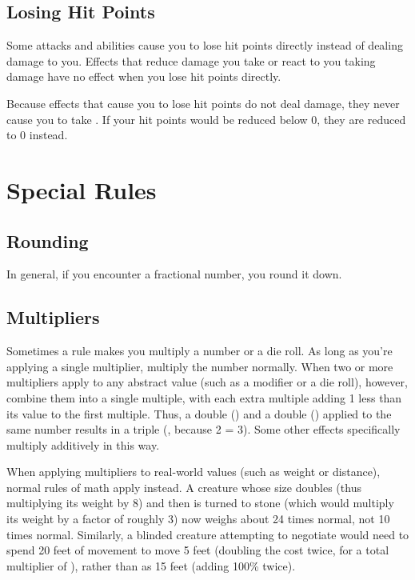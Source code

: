     \subsection{Losing Hit Points}\label{Losing Hit Points}
        Some attacks and abilities cause you to lose hit points directly instead of dealing damage to you.
        Effects that reduce damage you take or react to you taking damage have no effect when you lose hit points directly.

        Because effects that cause you to lose hit points do not deal damage, they never cause you to take .
        If your hit points would be reduced below 0, they are reduced to 0 instead.

\section{Special Rules}

    \subsection{Rounding}
        In general, if you encounter a fractional number, you round it down.

    \subsection{Multipliers}
        Sometimes a rule makes you multiply a number or a die roll.
        As long as you're applying a single multiplier, multiply the number normally.
        When two or more multipliers apply to any abstract value (such as a modifier or a die roll), however, combine them into a single multiple, with each extra multiple adding 1 less than its value to the first multiple.
        Thus, a double () and a double () applied to the same number results in a triple (, because 2  = 3).
        Some other effects specifically multiply additively in this way.

        When applying multipliers to real-world values (such as weight or distance), normal rules of math apply instead.
        A creature whose size doubles (thus multiplying its weight by 8) and then is turned to stone (which would multiply its weight by a factor of roughly 3) now weighs about 24 times normal, not 10 times normal.
        Similarly, a blinded creature attempting to negotiate  would need to spend 20 feet of movement to move 5 feet (doubling the cost twice, for a total multiplier of ), rather than as 15 feet (adding 100\% twice).

